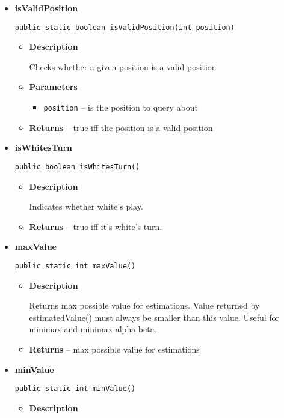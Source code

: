 \documentclass[11pt,a4paper]{report}
\begin{document}
{{{{{{{{{{{\begin{itemize}
{\begin{itemize}
{Checks whether the current state is valid
}
\item{{\bf  Returns} -- 
true iff the current state is valid. 
}%
\end{itemize}
}%
\item{ 
{\bf  isValidPosition}\\
\begin{lstlisting}[frame=none]
public static boolean isValidPosition(int position)\end{lstlisting} %
\begin{itemize}
\item{
{\bf  Description}

Checks whether a given position is a valid position
}
\item{
{\bf  Parameters}
  \begin{itemize}
   \item{
\texttt{position} -- is the position to query about}
  \end{itemize}
}%
\item{{\bf  Returns} -- 
true iff the position is a valid position 
}%
\end{itemize}
}%
\item{ 
{\bf  isWhitesTurn}\\
\begin{lstlisting}[frame=none]
public boolean isWhitesTurn()\end{lstlisting} %
\begin{itemize}
\item{
{\bf  Description}

Indicates whether white's play.
}
\item{{\bf  Returns} -- 
true iff it's white's turn. 
}%
\end{itemize}
}%
\item{ 
{\bf  maxValue}\\
\begin{lstlisting}[frame=none]
public static int maxValue()\end{lstlisting} %
\begin{itemize}
\item{
{\bf  Description}

Returns max possible value for estimations. Value returned by estimatedValue() must always be smaller than this value. Useful for minimax and minimax alpha beta.
}
\item{{\bf  Returns} -- 
max possible value for estimations 
}%
\end{itemize}
}%
\item{ 
{\bf  minValue}\\
\begin{lstlisting}[frame=none]
public static int minValue()\end{lstlisting} %
\begin{itemize}
\item{
{\bf  Description}

}
\end{itemize}}
\end{itemize}}}}}}}}}}}}
\end{document}
